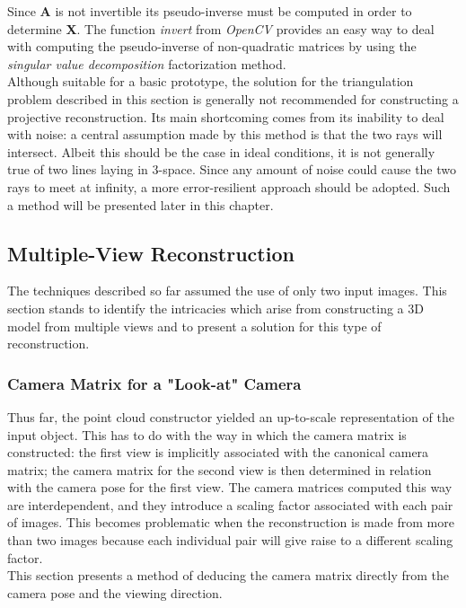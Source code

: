 \documentclass[12pt,a4paper,twoside,openright]{report}
\begin{document}
Since \textbf{A} is not invertible its pseudo-inverse must be computed in order to determine \textbf{X}. The function \emph{invert} from \emph{OpenCV} provides an easy way to deal with computing the pseudo-inverse of non-quadratic matrices by using the \emph{singular value decomposition}\cite[p.~82]{Suli+2003} factorization method.\\
\linebreak
Although suitable for a basic prototype, the solution for the triangulation problem described in this section is generally not recommended for constructing a projective reconstruction. Its main shortcoming comes from its inability to deal with noise: a central assumption made by this method is that the two rays will intersect. Albeit this should be the case in ideal conditions, it is not generally true of two lines laying in 3-space. Since any amount of noise could cause the two rays to meet at infinity, a more error-resilient approach should be adopted. Such a method will be presented later in this chapter.


\subsection{Multiple-View Reconstruction}
The techniques described so far assumed the use of only two input images. This section stands to identify the intricacies which arise from constructing a 3D model from multiple views and to present a solution for this type of reconstruction.

\subsubsection{Camera Matrix for a "Look-at" Camera}
Thus far, the point cloud constructor yielded an up-to-scale representation of the input object. This has to do with the way in which the camera matrix is constructed: the first view is implicitly associated with the canonical camera matrix; the camera matrix for the second view is then determined in relation with the camera pose for the first view. The camera matrices computed this way are interdependent, and they introduce a scaling factor associated with each pair of images. This becomes problematic when the reconstruction is made from more than two images because each individual pair will give raise to a different scaling factor. \\
This section presents a method of deducing the camera matrix directly from the camera pose and the viewing direction.
\end{document}
